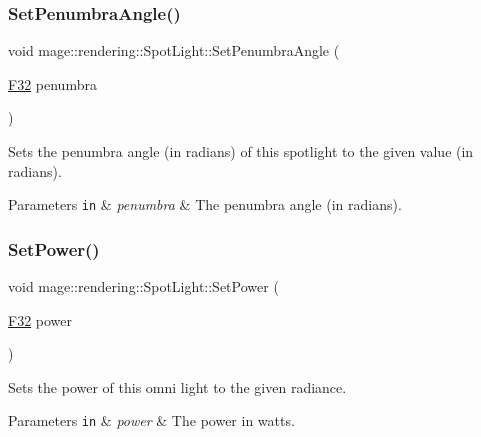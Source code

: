\subsubsection{\texorpdfstring{Set\+Penumbra\+Angle()}{SetPenumbraAngle()}}
{\footnotesize\ttfamily void mage\+::rendering\+::\+Spot\+Light\+::\+Set\+Penumbra\+Angle (\begin{DoxyParamCaption}\item[{\hyperlink{namespacemage_aa97e833b45f06d60a0a9c4fc22ae02c0}{F32}}]{penumbra }\end{DoxyParamCaption})\hspace{0.3cm}{\ttfamily [noexcept]}}

Sets the penumbra angle (in radians) of this spotlight to the given value (in radians).


\begin{DoxyParams}[1]{Parameters}
\mbox{\tt in}  & {\em penumbra} & The penumbra angle (in radians). \\
\hline
\end{DoxyParams}
\hypertarget{classmage_1_1rendering_1_1_spot_light_ac40537f953422276d68053e68df9fbe1}{}\label{classmage_1_1rendering_1_1_spot_light_ac40537f953422276d68053e68df9fbe1} 
\subsubsection{\texorpdfstring{Set\+Power()}{SetPower()}}
{\footnotesize\ttfamily void mage\+::rendering\+::\+Spot\+Light\+::\+Set\+Power (\begin{DoxyParamCaption}\item[{\hyperlink{namespacemage_aa97e833b45f06d60a0a9c4fc22ae02c0}{F32}}]{power }\end{DoxyParamCaption})\hspace{0.3cm}{\ttfamily [noexcept]}}

Sets the power of this omni light to the given radiance.


\begin{DoxyParams}[1]{Parameters}
\mbox{\tt in}  & {\em power} & The power in watts. \\
\hline
\end{DoxyParams}
\hypertarget{classmage_1_1rendering_1_1_spot_light_a87711b67a7a16809711f9841e4708720}{}\label{classmage_1_1rendering_1_1_spot_light_a87711b67a7a16809711f9841e4708720} 
